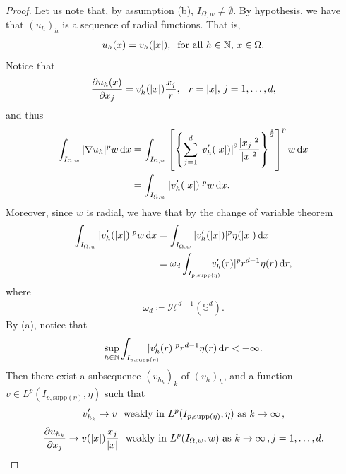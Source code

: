 \documentclass[11pt,leqno]{amsart}
\theoremstyle{remark}
\theoremstyle{definition}
\theoremstyle{definition}
\newcommand{\supp}{\mathrm{supp}}
\def\de{{\rm d}}
\begin{document}
\begin{proof}
 Let us note that, by assumption (b), $I_{\Omega,w}\neq\emptyset$. By hypothesis, we have that $(u_{h})_{h}$ is a sequence of radial functions. That is,
\begin{align*}
 u_{h}(x)=v_{h}(\vert x\vert), \hskip 0,2cm \text{for all $h\in\mathbb{N}$, $x\in \Omega$.}
 \end{align*}
 Notice that 
\begin{align*}
\frac{\partial u_{h}(x)}{\partial x_{j}}=v_{h}'(\vert x\vert)\frac{x_{j}}{r}, \hskip 0,2cm\, r=\vert x \vert,\, j=1,\ldots,d,
\end{align*}
 and thus 
\begin{align*}
\int_{I_{\Omega,w}}|\nabla u_h|^{p}w\,\de x&=\int_{I_{\Omega,w}}\left[\left\{\sum_{j=1}^{d}|v_{h}'(\vert x\vert)|^{2}\frac{\vert x_{j}\vert^{2}}{\vert x\vert^{2}}\right\}^{\frac{1}{2}}\right]^{p}w\,\de x\\
&=\int_{I_{\Omega,w}}|v_{h}'(\vert x\vert)|^{p}w\,\de x.
\end{align*}
Moreover, since $w$ is radial, we have that by the change of variable theorem
\begin{align*}
\displaystyle\int_{I_{\Omega,w}}|v_{h}'(\vert x\vert)|^{p}w\,\de x&=\displaystyle\int_{I_{\Omega,w}}|v_{h}'(\vert x\vert)|^{p}\eta(\vert x\vert)\,\de x\\
&=\omega_{d}\displaystyle\int_{I_{p,\supp(\eta)}}\hskip -0,5cm|v_{h}'(r)|^{p}r^{d-1}\eta(r)\,\de r,
\end{align*}
where 
\begin{align}
\label{misurasfera}
\omega_{d}\coloneqq \mathcal{H}^{d-1}(\mathbb{S}^{d}).
\end{align}
By (a), notice that 
\begin{align*}
\sup_{h\in \mathbb{N}}\displaystyle\int_{I_{p,\supp(\eta)}}\hskip -0,5cm|v_{h}'(r)|^{p}r^{d-1}\eta(r)\,\de r<+\infty.
\end{align*}
Then there exist a subsequence $(v_{h_k})_k$ of $(v_h)_h$, 
and  a function $v\in L^{p}(I_{p,\supp(\eta)},\eta)$ such that 
\begin{equation}\label{(2)}
v_{h_k}'\to v {\ \ \rm weakly \ in \ }L^{p}(I_{p,\supp(\eta)},\eta)\text{ as }k\to\infty\,,
\end{equation} 
\begin{equation*}
\frac{\partial u_{h_{k}}}{\partial x_{j}}\to v(\vert x\vert)\frac{x_{j}}{\vert x\vert}{\ \ \rm weakly \ in \ }L^{p}(I_{\Omega,w},w)\text{ as }k\to\infty\,, j=1,\ldots,d.
\end{equation*} 

\end{proof}
\end{document}
